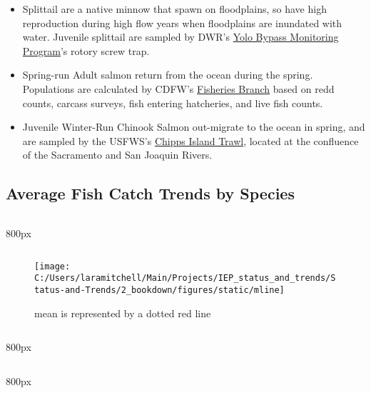 \documentclass[
]{book}
\providecommand{\tightlist}{%
  \setlength{\itemsep}{0pt}\setlength{\parskip}{0pt}}
\begin{document}
\begin{itemize}
\tightlist
\item
  Splittail are a native minnow that spawn on floodplains, so have high reproduction during high flow years when floodplains are inundated with water. Juvenile splittail are sampled by DWR's \href{https://portal.edirepository.org/nis/mapbrowse?packageid=edi.233.2}{Yolo Bypass Monitoring Program}'s rotory screw trap.
\item
  Spring-run Adult salmon return from the ocean during the spring. Populations are calculated by CDFW's \href{http://www.cbr.washington.edu/sacramento/data/query_adult_grandtab.html}{Fisheries Branch} based on redd counts, carcass surveys, fish entering hatcheries, and live fish counts.
\item
  Juvenile Winter-Run Chinook Salmon out-migrate to the ocean in spring, and are sampled by the USFWS's \href{https://www.fws.gov/lodi/juvenile_fish_monitoring_program/jfmp_index.htm}{Chipps Island Trawl}, located at the confluence of the Sacramento and San Joaquin Rivers.
\end{itemize}

\hypertarget{average-fish-catch-trends-by-species}{%
\subsection{Average Fish Catch Trends by Species}\label{average-fish-catch-trends-by-species}}

\begin{columns-nocenter}

\begin{column}{800px\textwidth}
\begin{column}

\begin{figure}
\texttt{[image: C:/Users/laramitchell/Main/Projects/IEP\_status\_and\_trends/Status-and-Trends/2\_bookdown/figures/static/mline]} \caption{mean is represented by a dotted red line}\label{fig:unnamed-chunk-31}
\end{figure}

\end{column}
\end{column}

\begin{column}{800px\textwidth}
\begin{column}

\end{column}
\end{column}

\begin{column}{800px\textwidth}
\begin{column}

\end{column}
\end{column}

\end{columns-nocenter}
\end{document}
